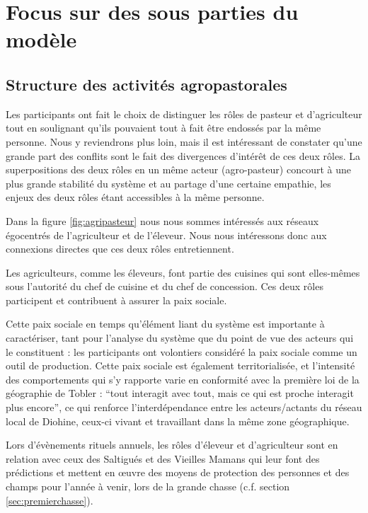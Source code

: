 \chapter{Focus sur des sous parties du modèle}

\section{Structure des activités agropastorales}

Les participants ont fait le choix de distinguer les rôles de pasteur et d'agriculteur tout en soulignant qu'ils pouvaient tout à fait être endossés par la même personne. Nous y reviendrons plus loin, mais il est intéressant de constater qu'une grande part des conflits sont le fait des divergences d'intérêt de ces deux rôles. La superpositions des deux rôles en un même acteur (agro-pasteur) concourt à une plus grande stabilité du système et au partage d'une certaine empathie, les enjeux des deux rôles étant accessibles à la même personne.

Dans la figure \ref{fig:agripasteur} nous nous sommes intéressés aux réseaux égocentrés de l'agriculteur et de l'éleveur. Nous nous intéressons donc aux connexions directes que ces deux rôles entretiennent.

Les agriculteurs, comme les éleveurs, font partie des cuisines qui sont elles-mêmes sous l'autorité du chef de cuisine et du chef de concession. Ces deux rôles participent et contribuent à assurer la paix sociale.

Cette paix sociale en temps qu'élément liant du système est importante à caractériser, tant pour l'analyse du système que du point de vue des acteurs qui le constituent : les participants ont volontiers considéré la paix sociale comme un outil de production. Cette paix sociale est également territorialisée, et l'intensité des comportements qui s'y rapporte varie en conformité avec la première loi de la géographie de Tobler : “tout interagit avec tout, mais ce qui est proche interagit plus encore”, ce qui renforce l'interdépendance entre les acteurs/actants du réseau local de Diohine, ceux-ci vivant et travaillant dans la même zone géographique.

Lors d'évènements rituels annuels, les rôles d'éleveur et d'agriculteur sont en relation avec ceux des Saltigués et des Vieilles Mamans qui leur font des prédictions et mettent en œuvre des moyens de protection des personnes et des champs pour l'année à venir, lors de la grande chasse (c.f. section \ref{sec:premierchasse}).

